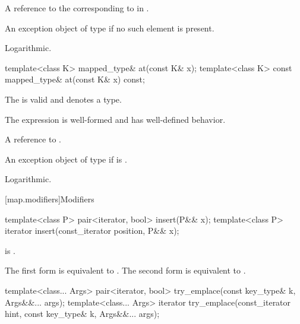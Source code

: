 \begin{itemdescr}
\pnum
\returns
A reference to the  corresponding to  in .

\pnum
\throws
An exception object of type  if
no such element is present.

\pnum
\complexity
Logarithmic.
\end{itemdescr}

%
\begin{itemdecl}
template<class K> mapped_type&       at(const K& x);
template<class K> const mapped_type& at(const K& x) const;
\end{itemdecl}

\begin{itemdescr}
\pnum
\constraints
The  
is valid and denotes a type.

\pnum
\expects
The expression  is well-formed and has well-defined behavior.

\pnum
\returns
A reference to .

\pnum
\throws
An exception object of type  if
 is .

\pnum
\complexity
Logarithmic.
\end{itemdescr}

[map.modifiers]{Modifiers}

%
\begin{itemdecl}
template<class P>
  pair<iterator, bool> insert(P&& x);
template<class P>
  iterator insert(const_iterator position, P&& x);
\end{itemdecl}

\begin{itemdescr}
\pnum
\constraints
{} is .

\pnum
\effects
The first form is equivalent to
. The second form is
equivalent to .
\end{itemdescr}

%
\begin{itemdecl}
template<class... Args>
  pair<iterator, bool> try_emplace(const key_type& k, Args&&... args);
template<class... Args>
  iterator try_emplace(const_iterator hint, const key_type& k, Args&&... args);
\end{itemdecl}

